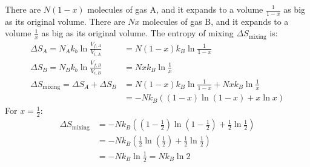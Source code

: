 \documentclass{article}
\begin{document}
There are $N\left(1 - x\right)$ molecules of gas A, and it expands to a volume $\frac{1}{1 - x}$ as big as its original volume. There are $Nx$ molecules of gas B, and it expands to a volume $\frac{1}{x}$ as big as its original volume. The entropy of mixing $\Delta S_{\text{mixing}}$ is:
\begin{equation}
    \begin{split}
        \Delta S_A = N_A k_b\ln\frac{V_{f,A}}{V_{i,A}} & = N\left(1 - x\right)k_B\ln\frac{1}{1 - x} \\
        \Delta S_B = N_B k_b\ln\frac{V_{f,B}}{V_{i,B}} & = Nxk_B\ln\frac{1}{x} \\
        \Delta S_{\text{mixing}} = \Delta S_A + \Delta S_B & = N\left(1 - x\right)k_B\ln\frac{1}{1 - x} + Nxk_B\ln\frac{1}{x} \\
        & = -Nk_B\left(\left(1 - x\right)\ln\left(1 - x\right) + x\ln x\right)
    \end{split}
\end{equation}
For $x = \frac{1}{2}$:
\begin{equation}
    \begin{split}
        \Delta S_{\text{mixing}} & = -Nk_B\left(\left(1 - \frac{1}{2}\right)\ln\left(1 - \frac{1}{2}\right) + \frac{1}{2}\ln \frac{1}{2}\right) \\
        & = -Nk_B\left(\frac{1}{2}\ln\left(\frac{1}{2}\right) + \frac{1}{2}\ln \frac{1}{2}\right) \\
        & = -Nk_B\ln \frac{1}{2} = Nk_B\ln 2 \\
    \end{split}
\end{equation}

\clearpage
\end{document}
